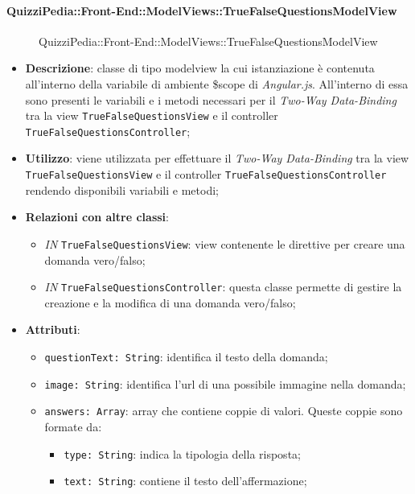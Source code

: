 \paragraph{QuizziPedia::Front-End::ModelViews::TrueFalseQuestionsModelView}
\begin{figure} [ht]
	\centering
	\caption{QuizziPedia::Front-End::ModelViews::TrueFalseQuestionsModelView}
\end{figure} \FloatBarrier
\begin{itemize}
	\item \textbf{Descrizione}: classe di tipo modelview la cui istanziazione è contenuta all'interno della variabile di ambiente \$scope di \textit{Angular.js}. All'interno di essa sono presenti le variabili e i metodi necessari per il \textit{Two-Way Data-Binding} tra la view \texttt{TrueFalseQuestionsView} e il controller \texttt{TrueFalseQuestionsController}; 
	\item \textbf{Utilizzo}: viene utilizzata per effettuare il \textit{Two-Way Data-Binding} tra la view \texttt{TrueFalseQuestionsView} e il controller \texttt{TrueFalseQuestionsController} rendendo disponibili variabili e metodi;
	\item \textbf{Relazioni con altre classi}:
	\begin{itemize}
		\item \textit{IN} \texttt{TrueFalseQuestionsView}: view contenente le direttive per creare una domanda vero/falso; 
		\item \textit{IN} \texttt{TrueFalseQuestionsController}: questa classe permette di gestire la creazione e la modifica di una domanda vero/falso;
	\end{itemize}
	\item \textbf{Attributi}:
	\begin{itemize}
		\item \texttt{questionText: String}: identifica il testo della domanda;
		\item \texttt{image: String}: identifica l'url di una possibile immagine nella domanda;
		\item \texttt{answers: Array}: array che contiene coppie di valori. Queste coppie sono formate da:
		\begin{itemize}
			\item \texttt{type: String}: indica la tipologia della risposta;
			\item \texttt{text: String}: contiene il testo dell'affermazione;

\end{itemize}
\end{itemize}
\end{itemize}
